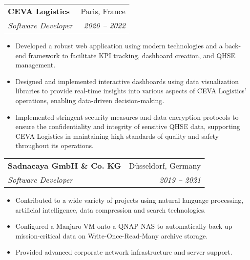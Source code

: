 \documentclass[a4paper,11pt]{article}
\makeatletter
\newcommand{\resumeItem}[2]{
  \item\small{
    \textbf{#1}{ #2 \vspace{-2pt}}
  }
}
\newcommand{\resumeSubheading}[4]{
  \vspace{-1pt}\item
    \begin{tabular*}{0.97\textwidth}{l@{\extracolsep{\fill}}r}
      \textbf{#1} & #2 \\
      \textit{\small#3} & \textit{\small #4} \\
    \end{tabular*}\vspace{-5pt}
}
\newcommand{\resumeItemListStart}{\begin{itemize}}
\newcommand{\resumeItemListEnd}{\end{itemize}\vspace{-5pt}}
\makeatother
\begin{document}
\iffalse
    \resumeSubheading
    {Hoffmann ai}{Paris, France}
    {Founder \& Software Engineer}{2020 -- Present}
    \resumeItemListStart
      \resumeItem{Spotmydive}
        {Wrote client-side code for web-based high-volume production application (120,000 unique visitors/mo). Improved conversion rate by 20\%.}
      \resumeItem{Orange Bank}
        {Designed, created and maintained a scalable web-based customer management app (TypeScript). Reduced customer acquisition cost by 10\%.}
      \resumeItem{CEVA Logistics}
        {Designed, developed, and maintained the front-end (ReactJS) and back-end (C\#) for highly available web application. Improved QHSE compliance and monitoring by 50\%.}
    \resumeItemListEnd
\fi

    \resumeSubheading
    {CEVA Logistics}{Paris, France}
    {Software Developer}{2020 -- 2022}
    \resumeItemListStart
      \resumeItem{}
        {Developed a robust web application using modern technologies and a back-end framework to facilitate KPI tracking, dashboard creation, and QHSE management.}
      \resumeItem{}
        {Designed and implemented interactive dashboards using data visualization libraries to provide real-time insights into various aspects of CEVA Logistics' operations, enabling data-driven decision-making.}
      \resumeItem{}
        {Implemented stringent security measures and data encryption protocols to ensure the confidentiality and integrity of sensitive QHSE data, supporting CEVA Logistics in maintaining high standards of quality and safety throughout its operations.}
    \resumeItemListEnd

\iffalse
    \resumeSubheading
    {Deutsche Telekom}{Bonn, Germany}
    {Digital Competence Instructor}{2021}
    \resumeItemListStart
      \resumeItem{}
        {Completed coursework modules encompassing various programming languages commonly used in web development, such as HTML, CSS, JavaScript, and frameworks like React and Angular.}
      \resumeItem{}
        {Explored the intricacies of network security within the context of web development, delving into concepts such as secure authentication, encryption, and protection against common web vulnerabilities.}
    \resumeItemListEnd
\fi   
      
    \resumeSubheading
    {Sadnacaya GmbH \& Co. KG}{Düsseldorf, Germany}
    {Software Developer}{2019 -- 2021}
    \resumeItemListStart
      \resumeItem{}
        {Contributed to a wide variety of projects using natural language processing, artificial intelligence, data compression and search technologies.}
      \resumeItem{}
        {Configured a Manjaro VM onto a QNAP NAS to automatically back up mission-critical data on Write-Once-Read-Many archive storage.}
      \resumeItem{}
        {Provided advanced corporate network infrastructure and server support.}
    \resumeItemListEnd
\end{document}
